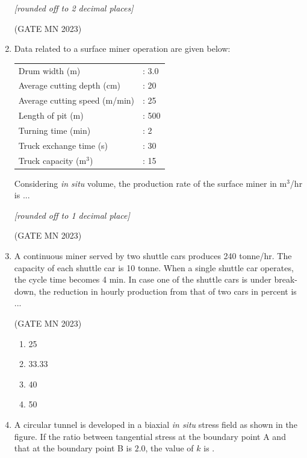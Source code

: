 \documentclass[journal]{IEEEtran}
\begin{document}
\begin{enumerate}
\textit{[rounded off to 2 decimal places]}  


\hfill(GATE MN 2023)
\item Data related to a surface miner operation are given below:  

\begin{tabular}{ll}
Drum width (m) & : 3.0 \\
Average cutting depth (cm) & : 20 \\
Average cutting speed (m/min) & : 25 \\
Length of pit (m) & : 500 \\
Turning time (min) & : 2 \\
Truck exchange time (s) & : 30 \\
Truck capacity (m$^3$) & : 15 \\
\end{tabular}


Considering \textit{in situ} volume, the production rate of the surface miner in m$^3$/hr is \underline{\hspace{2cm}}...  

\textit{[rounded off to 1 decimal place]}  


\hfill(GATE MN 2023)

\item A continuous miner served by two shuttle cars produces 240 tonne/hr. The capacity of each shuttle car is 10 tonne. When a single shuttle car operates, the cycle time becomes 4 min. In case one of the shuttle cars is under break-down, the reduction in hourly production from that of two cars in percent is \underline{\hspace{2cm}}...  


	\hfill(GATE MN 2023)
\begin{multicols}{4}
\begin{enumerate}
    \item 25
    \item 33.33
    \item 40
    \item 50
\end{enumerate}
\end{multicols}


\item A circular tunnel is developed in a biaxial \textit{in situ} stress field as shown in the figure. 
If the ratio between tangential stress at the boundary point A and that at the boundary point B is $2.0$, the value of $k$ is \underline{\hspace{2cm}}.  


\end{enumerate}
\end{document}

